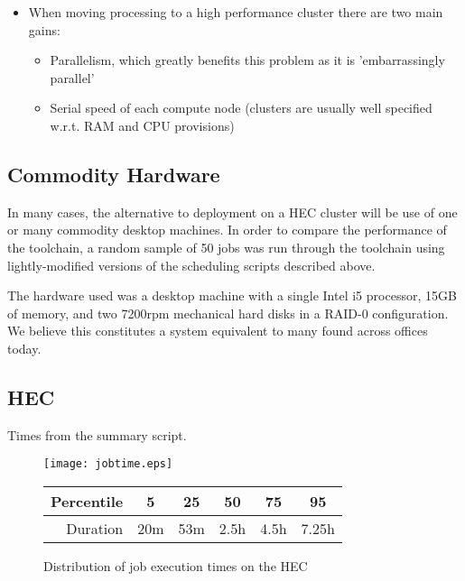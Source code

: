 \begin{itemize}
    \item When moving processing to a high performance cluster there are two main gains:
        \begin{itemize}
            \item Parallelism, which greatly benefits this problem as it is 'embarrassingly parallel'
            \item Serial speed of each compute node (clusters are usually well specified w.r.t. RAM and CPU provisions)
        \end{itemize}
\end{itemize}

\subsection{Commodity Hardware}
In many cases, the alternative to deployment on a HEC cluster will be use of one or many commodity desktop machines.  In order to compare the performance of the toolchain, a random sample of 50 jobs was run through the toolchain using lightly-modified versions of the scheduling scripts described above.

The hardware used was a desktop machine with a single Intel i5 processor, 15GB of memory, and two 7200rpm mechanical hard disks in a RAID-0 configuration.  We believe this constitutes a system equivalent to many found across offices today.





\subsection{HEC}
Times from the summary script.


\begin{figure}[h]
    \centering
    \texttt{[image: jobtime.eps]}

    \begin{tabular}{ | r | c | c | c | c | c | }
        \hline
        Percentile & 5 & 25 & 50 & 75 & 95 \\ \hline
        Duration & 20m & 53m & 2.5h & 4.5h & 7.25h \\ \hline
    \end{tabular}

    \caption{Distribution of job execution times on the HEC}
    \label{fig:jobtimes}
\end{figure}


